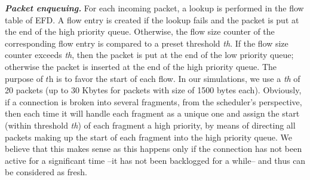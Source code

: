\documentclass[preprint,12pt]{elsarticle}
\begin{document}



\textit{\textbf{Packet enqueuing.}} For each incoming packet, a lookup is performed in the flow table of EFD. A flow entry is created if the lookup fails and the packet is put at the end of the high priority queue. Otherwise, the flow size counter of the corresponding flow entry is compared to a preset threshold \textit{th}. If the flow size counter exceeds \textit{th}, then the packet is put at the end of the low priority queue; otherwise the packet is inserted at the end of the high priority queue. The purpose of $\textit{th}$ is to favor the start of each flow. In our simulations, we use a \textit{th} of 20 packets (up to 30 Kbytes for packets with size of 1500 bytes each). Obviously, if a connection is broken into several fragments, from the scheduler's perspective, then each time it will handle each fragment as a unique one and assign the start (within threshold \textit{th}) of each fragment a high priority, by means of directing all packets making up the start of each fragment into the high priority queue. We believe that this makes sense as this happens only if the connection has not been active for a significant time --it has not been backlogged for a while-- and thus can be considered as fresh. 

\end{document}
